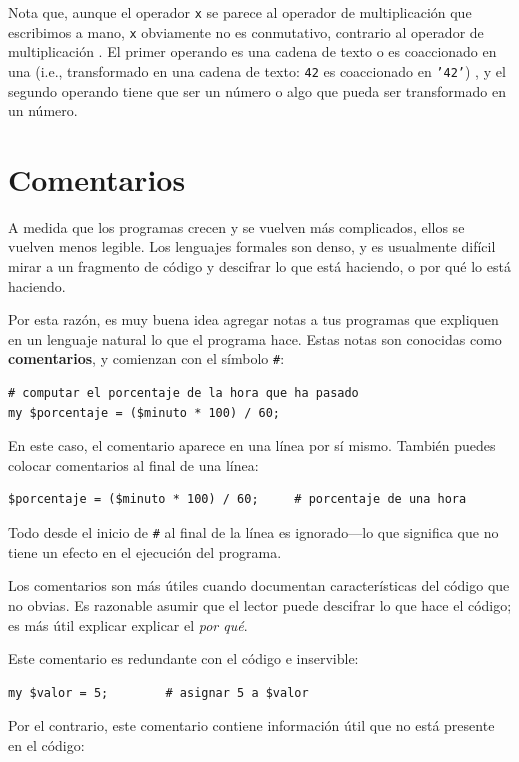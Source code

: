 Nota que, aunque el operador {\tt x} se parece al operador
de multiplicación que escribimos a mano, {\tt x} obviamente 
no es conmutativo, contrario al operador de multiplicación 
{\tt *}. El primer operando es una cadena de texto o es coaccionado
en una (i.e., transformado en una cadena de texto:
{\tt 42} es coaccionado en {\tt '42'})  , y el segundo operando
tiene que ser un número o algo que pueda ser transformado en 
un número.


\section{Comentarios}

A medida que los programas crecen y se vuelven más complicados,
ellos se vuelven menos legible. Los lenguajes formales son denso, y es usualmente
difícil mirar a un fragmento de código y descifrar lo que está haciendo,
o por qué lo está haciendo.

Por esta razón, es muy buena idea agregar notas a tus programas que expliquen en un
lenguaje natural lo que el programa hace. Estas notas son conocidas como {\bf comentarios},
y comienzan con el símbolo \verb|#|:

\begin{verbatim}
# computar el porcentaje de la hora que ha pasado
my $porcentaje = ($minuto * 100) / 60;
\end{verbatim}
%
En este caso, el comentario aparece en una línea por sí mismo. También puedes
colocar comentarios al final de una línea:

\begin{verbatim}
$porcentaje = ($minuto * 100) / 60;     # porcentaje de una hora
\end{verbatim}
%
Todo desde el inicio de {\tt \#} al final de la línea es ignorado---lo que significa
que no tiene un efecto en el ejecución del programa.

Los comentarios son más útiles cuando documentan características del código
que no obvias. Es razonable asumir que el lector puede descifrar lo que 
hace el código; es más útil explicar explicar el {\em por qué}.

Este comentario es redundante con el código e inservible:

\begin{verbatim}
my $valor = 5;        # asignar 5 a $valor
\end{verbatim}
%
Por el contrario, este comentario contiene información útil que no está
presente en el código:

